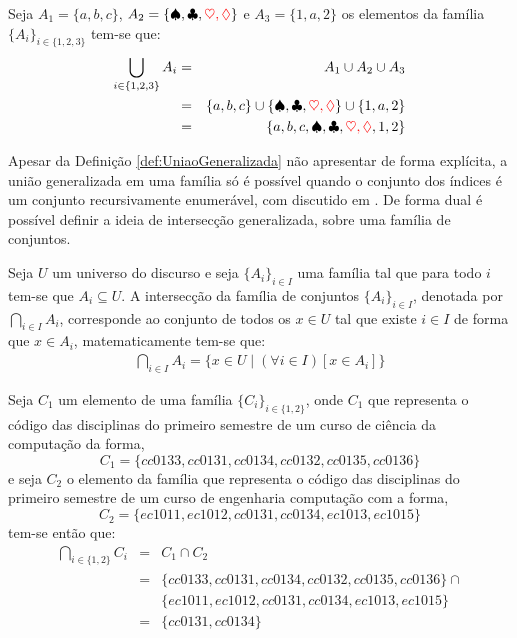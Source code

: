 \begin{exemplo}\label{exe:UniaoGeneralizada1}
	Seja $A_1 = \{a, b, c\}$, $A_2 = \{\spadesuit, \clubsuit, {\color{red} \heartsuit, \lozenge}\}$ e $A_3 = \{1, a, 2\}$ os elementos da família $\{A_i\}_{i \in \{1, 2, 3\}}$ tem-se que:
	\begin{eqnarray*}
		\bigcup_{i \in \{1, 2, 3\}} A_i & = & A_1 \cup A_2 \cup A_3\\
		& = & \{a, b, c\} \cup \{\spadesuit, \clubsuit, {\color{red} \heartsuit, \lozenge}\} \cup \{1, a, 2\}\\
		& = & \{a, b, c, \spadesuit, \clubsuit, {\color{red} \heartsuit, \lozenge}, 1, 2\}
	\end{eqnarray*}
\end{exemplo}

Apesar da Definição \ref{def:UniaoGeneralizada} não apresentar de forma explícita, a união generalizada em uma família só é possível quando o conjunto dos índices é um conjunto recursivamente enumerável, com discutido em \cite{carmo2013}. De forma dual é possível definir a ideia de intersecção generalizada, sobre uma família de conjuntos.

\begin{definicao}\label{def:IntersecaoGeneralizada}
	Seja $U$ um universo do discurso e seja $\{{A_i}\}_{i \in I}$ uma família tal que para todo $i$ tem-se que $A_i \subseteq U$. A intersecção da família de conjuntos $\{{A_i}\}_{i \in I}$, denotada por $\bigcap_{i \in I} A_i$, corresponde ao conjunto de todos os $x \in U$ tal que existe $i \in I$ de forma que $x \in A_i$, matematicamente tem-se que:
	\begin{eqnarray*}
		\bigcap_{i \in I} A_i = \{x \in U \mid (\forall i \in I)[x \in A_i]\}
	\end{eqnarray*}
\end{definicao}

\begin{exemplo}\label{exe:IntersecaoGeneralizada1}
	Seja $C_1$ um elemento de uma família $\{C_i\}_{i \in \{1, 2\}}$, onde $C_1$ que representa o código das disciplinas do primeiro semestre de um curso de ciência da computação da forma,
	$$C_1 = \{cc0133, cc0131, cc0134, cc0132, cc0135, cc0136\}$$ 
	e seja $C_2$ o elemento da família que representa o código das disciplinas do primeiro semestre de um curso de engenharia computação com a forma,
	$$C_2 = \{ec1011, ec1012, cc0131, cc0134, ec1013, ec1015\}$$ 
	tem-se então que:
	\begin{eqnarray*}
		\bigcap_{i \in \{1, 2\}} C_i & = & C_1 \cap C_2\\
		& = & \{cc0133, cc0131, cc0134, cc0132, cc0135, cc0136\} \cap\\
		&   & \{ec1011, ec1012, cc0131, cc0134, ec1013, ec1015\}\\
		& = & \{cc0131, cc0134\}
	\end{eqnarray*}
\end{exemplo}

